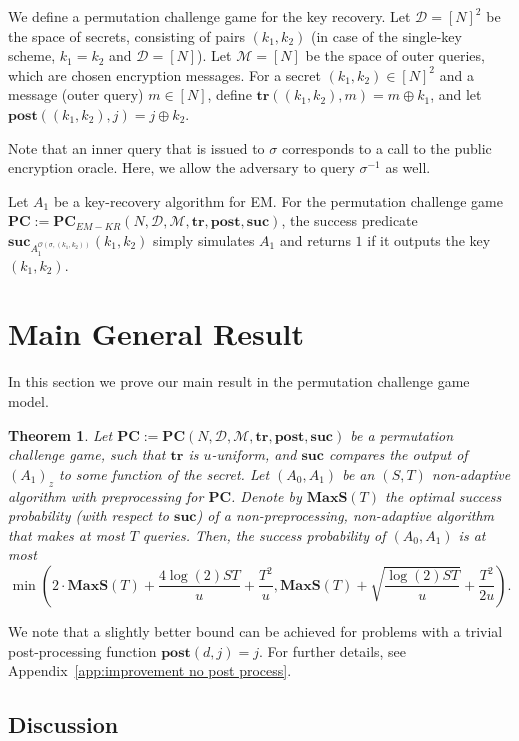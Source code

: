 \documentclass[11pt]{article}
\newtheorem{theorem}{Theorem}[section]
\newcommand{\SECS}{{\mathcal{D}}}
\newcommand{\secv}{{d}}
\newcommand{\SUC}{\boldsymbol{suc}}
\newcommand{\TR}{\boldsymbol{tr}}
\newcommand{\POST}{\boldsymbol{post}}
\newcommand{\PC}{\boldsymbol{PC}}
\newcommand{\MAXS}{\boldsymbol{MaxS}}
\begin{document}
We define a permutation challenge game for the key recovery. 
Let $\SECS = [N]^2$ be the space of secrets, consisting of pairs $(k_1,k_2)$ (in case of the single-key scheme, $k_1 = k_2$ and $\SECS = [N]$).
Let $\mathcal{M} = [N]$ be the space of outer queries, which are chosen encryption messages.
For a secret $(k_1,k_2) \in [N]^2$ and
a message (outer query) $m \in [N]$,
define 
$\TR((k_1,k_2),m) = m \oplus k_1$, and let $\POST((k_1,k_2),j) = j \oplus k_2$.

Note that an inner query that is issued to $\sigma$ corresponds to 
a call to the public encryption oracle. Here, we allow the adversary to query $\sigma^{-1}$ as well.

Let $A_1$ be a key-recovery algorithm for EM.
For the permutation challenge game $\PC := \PC_{EM-KR}(N,\SECS,\mathcal{M},\TR,\POST,\SUC)$,
the success predicate
$\SUC_{A_1^{\mathcal{O}(\sigma,(k_1,k_2))}}(k_1,k_2)$
simply simulates $A_1$ and returns $1$ if it outputs the key $(k_1,k_2)$.


\section{Main General Result}
\label{sec:main}

In this section we prove our main result in the permutation challenge game model.


\begin{theorem} \label{thm:g-nonadaptive}
Let $\PC := \PC(N,\SECS,\mathcal{M},\TR,\POST,\SUC)$ be a permutation challenge game, such that 
$\TR$ is $u$-uniform,
and $\SUC$ compares the output of $(A_1)_z$ to some function of the secret.
Let $(A_0,A_1)$ be an $(S,T)$ non-adaptive algorithm with preprocessing for $\PC$.
Denote by $\MAXS(T)$ the optimal success probability (with respect to $\SUC$) of a non-preprocessing, non-adaptive algorithm that makes at most $T$ queries.
Then, the success probability of $(A_0,A_1)$ is at most
\[
\min \left(2\cdot \MAXS(T) + \frac{4\log(2) S T }{u} + \frac{T^2}{u}, \MAXS(T) + 
\sqrt{\frac{\log(2) ST} {{u}}} + \frac{T^2}{2u} \right).
\]
\end{theorem}
We note that a slightly better bound can be achieved for problems with a trivial post-processing function $\POST(\secv,j)=j$. For further details, see Appendix~\ref{app:improvement no post process}.

\subsection{Discussion}
\end{document}
